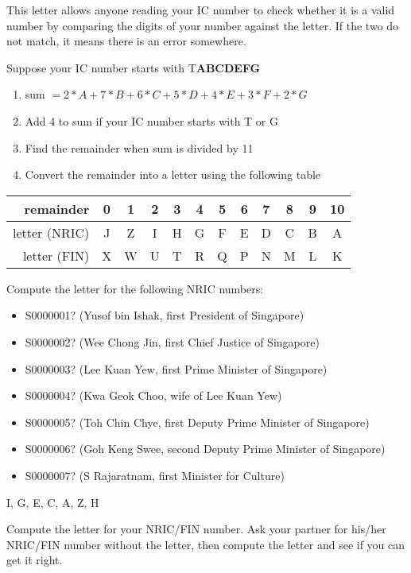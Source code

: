 \documentclass[a4paper,12pt]{article}
\begin{document}
This letter allows anyone reading your IC number to check
whether it is a valid number by comparing the digits of your number against the
letter. If the two do not match, it means there is an error somewhere.

Suppose your IC number starts with T\textbf{ABCDEFG}
\begin{enumerate}
    \item sum $= 2 * A + 7 * B + 6 * C + 5 * D + 4 * E + 3 * F + 2 * G$
    \item Add 4 to sum if your IC number starts with T or G
    \item Find the remainder when sum is divided by 11
    \item Convert the remainder into a letter using the following table
\end{enumerate}

\begin{tabular}{r||ccccccccccc}
    remainder     & 0 & 1 & 2 & 3 & 4 & 5 & 6 & 7 & 8 & 9 & 10 \\ \hline
    letter (NRIC) & J & Z & I & H & G & F & E & D & C & B & A  \\
    letter (FIN)  & X & W & U & T & R & Q & P & N & M & L & K
\end{tabular}


\begin{question}[skip-below=0\baselineskip]
Compute the letter for the following NRIC numbers:
\begin{itemize}
    \item S0000001? (Yusof bin Ishak, first President of Singapore)
    \item S0000002? (Wee Chong Jin, first Chief Justice of Singapore)
    \item S0000003? (Lee Kuan Yew, first Prime Minister of Singapore)
    \item S0000004? (Kwa Geok Choo, wife of Lee Kuan Yew)
    \item S0000005? (Toh Chin Chye, first Deputy Prime Minister of Singapore)
    \item S0000006? (Goh Keng Swee, second Deputy Prime Minister of Singapore)
    \item S0000007? (S Rajaratnam, first Minister for Culture)
\end{itemize}
\end{question}
\begin{solution}
I, G, E, C, A, Z, H
\end{solution}

\begin{question}[skip-below=3\baselineskip]
Compute the letter for your NRIC/FIN number. Ask your partner for
his/her NRIC/FIN number without the letter, then compute
the letter and see if you can get it right.
\end{question}
\end{document}
